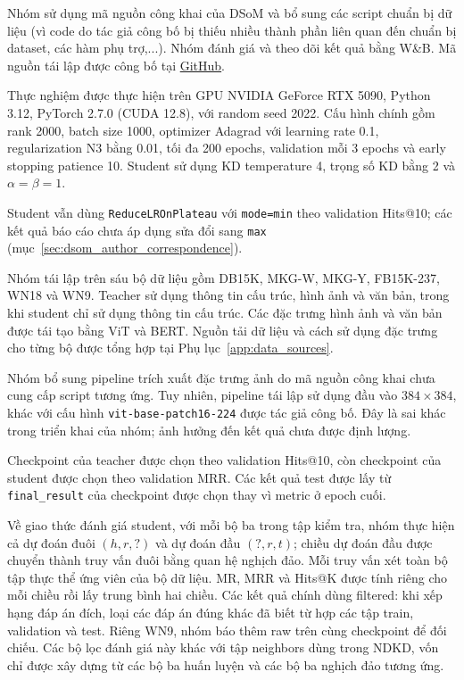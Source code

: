 Nhóm sử dụng mã nguồn công khai của DSoM và bổ sung các script chuẩn bị dữ liệu (vì code do tác giả công bố bị thiếu nhiều thành phần liên quan đến chuẩn bị dataset, các hàm phụ trợ,...). Nhóm đánh giá và theo dõi kết quả bằng W\&B.
Mã nguồn tái lập được công bố tại
\href{https://github.com/keiranoluv/Reproduce_DSoM}{GitHub}.

Thực nghiệm được thực hiện trên GPU NVIDIA
GeForce RTX 5090, Python 3.12,
PyTorch 2.7.0 (CUDA 12.8), với random seed 2022.
Cấu hình chính gồm rank 2000, batch size 1000,
optimizer Adagrad với learning rate 0.1,
regularization N3 bằng 0.01, tối đa 200 epochs,
validation mỗi 3 epochs và early stopping
patience 10. Student sử dụng KD temperature 4,
trọng số KD bằng 2 và $\alpha=\beta=1$.

Student vẫn dùng \texttt{ReduceLROnPlateau} với
\texttt{mode=min} theo validation Hits@10; các kết quả báo
cáo chưa áp dụng sửa đổi sang \texttt{max}
(mục~\ref{sec:dsom_author_correspondence}).


Nhóm tái lập trên sáu bộ dữ liệu gồm DB15K,
MKG-W, MKG-Y, FB15K-237, WN18 và WN9.
Teacher sử dụng thông tin cấu trúc, hình ảnh
và văn bản, trong khi student chỉ sử dụng
thông tin cấu trúc. Các đặc trưng hình ảnh
và văn bản được tái tạo bằng ViT và BERT.
Nguồn tải dữ liệu và cách sử dụng đặc trưng cho từng bộ
được tổng hợp tại Phụ lục~\ref{app:data_sources}.

\begin{samepage}
Nhóm bổ sung pipeline trích xuất đặc trưng ảnh do mã nguồn công
khai chưa cung cấp script tương ứng. Tuy nhiên, pipeline tái lập
sử dụng đầu vào $384\times384$, khác với cấu hình
\texttt{vit-base-patch16-224} được tác giả công bố.
Đây là sai khác trong triển khai của nhóm; ảnh hưởng đến kết quả
chưa được định lượng.
\par
\end{samepage}

\begin{samepage}
Checkpoint của teacher được chọn theo
validation Hits@10, còn checkpoint của
student được chọn theo validation MRR.
Các kết quả test được lấy từ
\texttt{final\_result} của checkpoint
được chọn thay vì metric ở epoch cuối.
\par
\end{samepage}

Về giao thức đánh giá student, với mỗi bộ ba trong tập kiểm tra,
nhóm thực hiện cả dự đoán đuôi $(h,r,?)$ và dự đoán đầu
$(?,r,t)$; chiều dự đoán đầu được chuyển thành truy vấn đuôi
bằng quan hệ nghịch đảo. Mỗi truy vấn xét toàn bộ tập thực thể
ứng viên của bộ dữ liệu. MR, MRR và Hits@K được tính riêng cho
mỗi chiều rồi lấy trung bình hai chiều. Các kết quả chính dùng
filtered: khi xếp hạng đáp án đích, loại các đáp án đúng khác
đã biết từ hợp các tập train, validation và test. Riêng WN9,
nhóm báo thêm raw trên cùng checkpoint để đối chiếu. Các bộ lọc
đánh giá này khác với tập neighbors dùng trong NDKD, vốn chỉ
được xây dựng từ các bộ ba huấn luyện và các bộ ba nghịch đảo
tương ứng.

